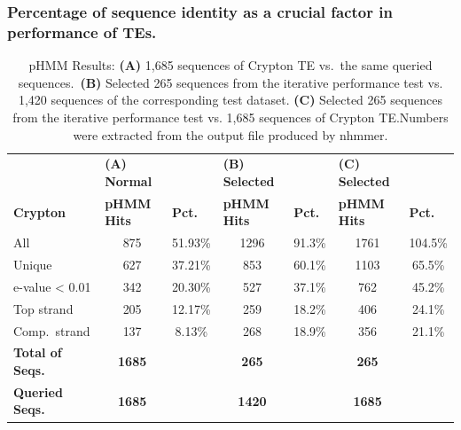 \documentclass[unnumsec,webpdf,contemporary,large]{oup-authoring-template}%
\theoremstyle{thmstyleone}%
\theoremstyle{thmstyletwo}%
\theoremstyle{thmstylethree}%
\begin{document}
\subsubsection{Percentage of sequence identity as a crucial factor in
performance of TEs.}\label{subsubsec3_1}
\begin{table}[!t]
\caption{pHMM Results: \textbf{(A)} 1,685 sequences of Crypton TE vs.\ the same
queried sequences.\ \textbf{(B)} Selected 265 sequences from the iterative
performance test vs. 1,420 sequences of the corresponding test dataset.
\textbf{(C)} Selected 265 sequences from the iterative performance test vs.
1,685 sequences of Crypton TE.\@ Numbers were extracted from the output file
produced by nhmmer. }\label{table:tab4}
\begin{tabular*}{\textwidth}{@{\extracolsep{\fill}}lcccccc@{\extracolsep{\fill}}}
\toprule
 & \multicolumn{1}{l}{\textbf{(A) Normal}} & \multicolumn{1}{l}{} &
  \multicolumn{1}{l}{\textbf{(B) Selected}} & \multicolumn{1}{l}{} &
  \multicolumn{1}{l}{\textbf{(C) Selected}} & \multicolumn{1}{l}{} \\
\textbf{Crypton} & \multicolumn{1}{l}{\textbf{pHMM Hits}} &
  \multicolumn{1}{l}{\textbf{Pct.}} & \multicolumn{1}{l}{\textbf{pHMM Hits}} &
  \multicolumn{1}{l}{\textbf{Pct.}} & \multicolumn{1}{l}{\textbf{pHMM Hits}} &
  \multicolumn{1}{l}{\textbf{Pct.}} \\
\midrule
All                     & 875           & 51.93\%              & 1296          &
91.3\%               & 1761          & 104.5\%              \\
Unique                  & 627           & 37.21\%              & 853           &
60.1\%               & 1103          & 65.5\%               \\
e-value \textless{} 0.01  & 342           & 20.30\%              & 527 & 37.1\%
& 762           & 45.2\%               \\
Top strand              & 205           & 12.17\%              & 259           &
18.2\%               & 406           & 24.1\%               \\
Comp.\ strand            & 137           & 8.13\%               & 268 & 18.9\% &
356           & 21.1\%               \\
\textbf{Total of Seqs.} & \textbf{1685} & \multicolumn{1}{l}{} & \textbf{265}  &
\multicolumn{1}{l}{} & \textbf{265}  & \multicolumn{1}{l}{} \\
\textbf{Queried Seqs.}  & \textbf{1685} & \multicolumn{1}{l}{} & \textbf{1420} &
\multicolumn{1}{l}{} & \textbf{1685} & \multicolumn{1}{l}{} \\
\bottomrule
\end{tabular*}
\end{table}
\raggedbottom{}
\end{document}
